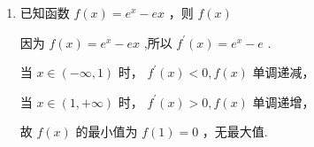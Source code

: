 \begin{enumerate}
\begin{enumerate}
\begin{jieda}
            当 $x \in  \left( {-1,3}\right)$ 时， ${f}^{\prime }\left( x\right)  < 0,f\left( x\right)$ 单调递减，
            
            当 $x \in  \left( {-3, - 1}\right)$ 时, ${f}^{\prime }\left( x\right)  > 0,f\left( x\right)$ 单调递增,
            
            所以 $f\left( x\right)$ 的最大值为 $f\left( {-1}\right)  = \dfrac{6}{{e}}$ ,
            
            又 $f\left( 3\right)  =  - 2{{e}}^{3},f\left( {-3}\right)  = {22}{{e}}^{-3}$ ,
            
            所以 $f\left( x\right)$ 的最大值为 $\dfrac{6}{{e}}$ ,最小值为 $- 2{{e}}^{3}$ .
        \end{jieda}
        \item 已知函数 $f\left( x\right)  = {{e}}^{x} - {e}x$ ，则 $f\left( x\right)$ 

        \begin{jieda}
            因为 $f\left( x\right)  = {{e}}^{x} - {e}x$ ,所以 ${f}^{\prime }\left( x\right)  = {{e}}^{x} - {e}$ .
            
            当 $x \in  \left( {-\infty ,1}\right)$ 时， ${f}^{\prime }\left( x\right)  < 0,f\left( x\right)$ 单调递减，
            
            当 $x \in  \left( {1, + \infty }\right)$ 时， ${f}^{\prime }\left( x\right)  > 0,f\left( x\right)$ 单调递增，
            
            故 $f\left( x\right)$ 的最小值为 $f\left( 1\right)  = 0$ ，无最大值.
        \end{jieda}
        

\end{enumerate}
\end{enumerate}
